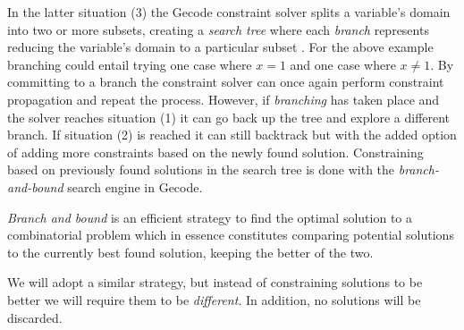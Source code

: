 In the latter situation (3) the Gecode constraint solver splits a variable's domain into
two or more subsets, creating a \textit{search tree} where each \textit{branch} represents
reducing the variable's domain to a particular subset \cite[Section~8]{MPG}. For the above
example branching could entail trying one case where $x=1$ and one case where $x\neq1$.
By committing to a branch the constraint solver can once again perform constraint
propagation and repeat the process. However, if \textit{branching} has taken place and the
solver reaches situation (1) it can go back up the tree and explore a different branch.
If situation (2) is reached it can still backtrack but with the added option of adding
more constraints based on the newly found solution. Constraining based on previously found
solutions in the search tree is done with the \textit{branch-and-bound} search
engine\cite[Section~9]{MPG} in Gecode.

\textit{Branch and bound} is an efficient strategy to find the optimal solution to a
combinatorial problem which in essence constitutes comparing potential solutions to the
currently best found solution, keeping the better of the two\cite{BaB}.

We will adopt a similar strategy, but instead of constraining solutions to be better we
will require them to be \textit{different}. In addition, no solutions will be discarded.

